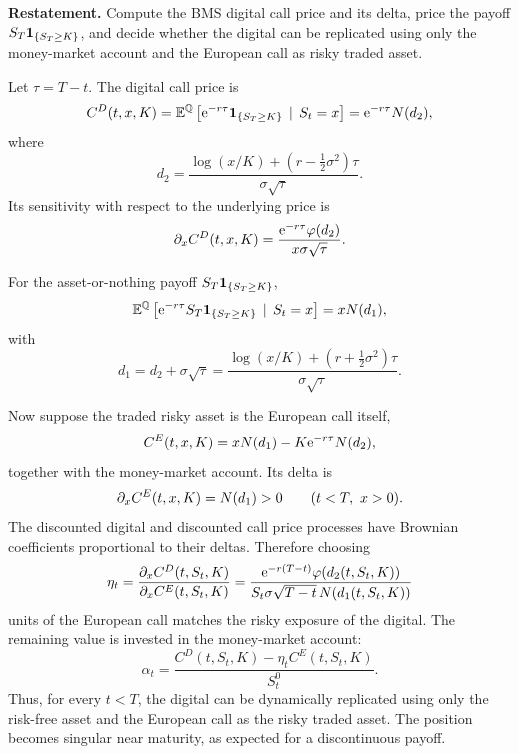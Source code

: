 \begin{exercise}
\textbf{Restatement.}
Compute the BMS digital call price and its delta, price the payoff
\(S_T\mathbf{1}_{\{S_T\ge K\}}\), and decide whether the digital can be replicated using
only the money-market account and the European call as risky traded asset.

\begin{solution}
Let \(\tau=T-t\).  The digital call price is
\[
  C^D(t,x,K)
    =\mathbb{E}^{\mathbb{Q}}\left[\mathrm{e}^{-r\tau}\mathbf{1}_{\{S_T\ge K\}}\,\mid\, S_t=x\right]
    =\mathrm{e}^{-r\tau}N(d_2),
\]
where
\[
  d_2=\frac{\log(x/K)+(r-\frac12\sigma^2)\tau}{\sigma\sqrt{\tau}}.
\]
Its sensitivity with respect to the underlying price is
\[
  \partial_x C^D(t,x,K)
    =\frac{\mathrm{e}^{-r\tau}\varphi(d_2)}{x\sigma\sqrt{\tau}}.
\]

For the asset-or-nothing payoff \(S_T\mathbf{1}_{\{S_T\ge K\}}\),
\[
  \mathbb{E}^{\mathbb{Q}}\left[\mathrm{e}^{-r\tau}S_T\mathbf{1}_{\{S_T\ge K\}}\,\mid\, S_t=x\right]
    =xN(d_1),
\]
with
\[
  d_1=d_2+\sigma\sqrt{\tau}
    =\frac{\log(x/K)+(r+\frac12\sigma^2)\tau}{\sigma\sqrt{\tau}}.
\]

Now suppose the traded risky asset is the European call itself,
\[
  C^E(t,x,K)=xN(d_1)-K\mathrm{e}^{-r\tau}N(d_2),
\]
together with the money-market account.  Its delta is
\[
  \partial_x C^E(t,x,K)=N(d_1)>0
  \qquad (t<T,\ x>0).
\]
The discounted digital and discounted call price processes have Brownian
coefficients proportional to their deltas.  Therefore choosing
\[
  \eta_t
    =\frac{\partial_xC^D(t,S_t,K)}{\partial_xC^E(t,S_t,K)}
    =
    \frac{\mathrm{e}^{-r(T-t)}\varphi(d_2(t,S_t,K))}
    {S_t\sigma\sqrt{T-t}\,N(d_1(t,S_t,K))}
\]
units of the European call matches the risky exposure of the digital.  The
remaining value is invested in the money-market account:
\[
  \alpha_t
    =\frac{C^D(t,S_t,K)-\eta_tC^E(t,S_t,K)}{S_t^0}.
\]
Thus, for every \(t<T\), the digital can be dynamically replicated using only
the risk-free asset and the European call as the risky traded asset.  The
position becomes singular near maturity, as expected for a discontinuous
payoff.
\end{solution}
\end{exercise}
